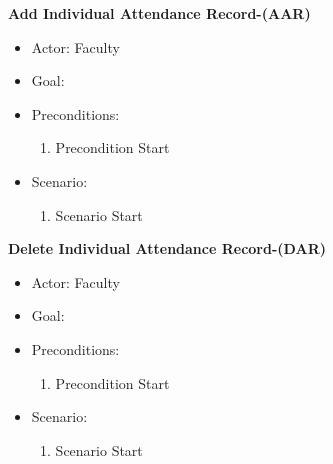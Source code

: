 \documentclass[letterpaper,12pt,oneside,listof=totoc]{scrreprt}
\begin{document}
\hfill \break
\textbf{Add Individual Attendance Record-(AAR)}
\begin{itemize}
    \item Actor: Faculty
    \item Goal:
    \item Preconditions:
    \begin{enumerate}
        \item Precondition Start
    \end{enumerate}
    \item Scenario:
    \begin{enumerate}
        \item Scenario Start
    \end{enumerate}
\end{itemize}

\hfill \break
\textbf{Delete Individual Attendance Record-(DAR)}
\begin{itemize}
    \item Actor: Faculty
    \item Goal:
    \item Preconditions:
    \begin{enumerate}
        \item Precondition Start
    \end{enumerate}
    \item Scenario:
    \begin{enumerate}
        \item Scenario Start
    \end{enumerate}
\end{itemize}
\end{document}
